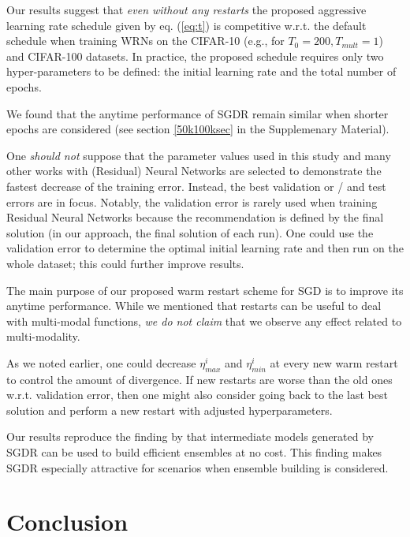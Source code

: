 \documentclass{article}
\begin{document}
Our results suggest that \textit{even without any restarts} the proposed aggressive learning rate schedule given by eq. (\ref{eq:t}) is competitive w.r.t. the default schedule when training WRNs on the CIFAR-10 (e.g., for $T_0=200, T_{mult}=1$) and CIFAR-100 datasets. In practice, the proposed schedule requires only two hyper-parameters to be defined: the initial learning rate and the total number of epochs. 

We found that the anytime performance of SGDR remain similar when shorter epochs are considered (see section \ref{50k100ksec} in the Supplemenary Material). 

One \textit{should not} suppose that the parameter values used in this study and many other works with (Residual) Neural Networks 
are selected to demonstrate the fastest decrease of the training error. Instead, the best validation or / and test errors are in focus. 
Notably, the validation error is rarely used when training Residual Neural Networks because the recommendation is defined by the final solution (in our approach, the final solution of each run). 
One could use the validation error to determine the optimal initial learning rate and then run on the whole dataset;
this could further improve results. 

The main purpose of our proposed warm restart scheme for SGD is to improve its anytime performance. 
While we mentioned that restarts can be useful to deal with multi-modal functions, 
\textit{we do not claim} that we observe any effect related to multi-modality.

As we noted earlier, one could decrease $\eta^i_{max}$ and $\eta^i_{min}$ at every new warm restart to 
control the amount of divergence. If new restarts are worse than the old ones w.r.t. validation error, 
then one might also consider going back to the last best solution and perform a new restart with 
adjusted hyperparameters. 

Our results reproduce the finding by \cite{SnapshotICLR2017} that intermediate models generated by SGDR can be used to build efficient ensembles at no cost.  This finding makes SGDR especially attractive for scenarios when ensemble building is considered. 

\section{Conclusion}
\end{document}
